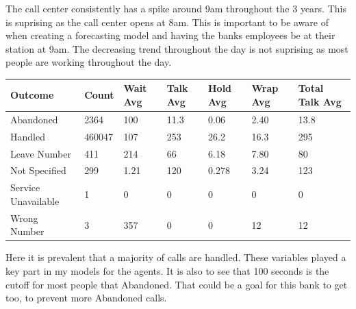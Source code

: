 \documentclass[12pt]{article}
\begin{document}
The call center consistently has a spike around 9am throughout the 3 years. This is suprising as the call center opens at 8am. This is important to be aware of when
creating a forecasting model and having the banks employees be at their station at 9am. The decreasing trend throughout the day is not suprising
as most people are working throughout the day.
\begin{table}[H]
  \resizebox{\textwidth}{!} {
  \begin{tabular}{ l | l | l | l | l | l | l}
    {\bf Outcome} & {\bf Count} & {\bf Wait Avg} & {\bf Talk Avg} & {\bf Hold Avg} & {\bf Wrap Avg} & {\bf Total Talk Avg} \\
  \hline
  Abandoned & 2364 & 100 & 11.3 & 0.06 & 2.40 & 13.8 \\
  \hline
  Handled & 460047 & 107 & 253 & 26.2 & 16.3 & 295\\
  \hline
  Leave Number & 411 & 214 & 66 & 6.18 & 7.80 & 80\\
  \hline
  Not Specified & 299 & 1.21 & 120 & 0.278 & 3.24 & 123\\
  \hline
  Service Unavailable & 1 & 0 & 0 & 0 & 0 & 0\\
  \hline
  Wrong Number & 3 & 357 & 0 & 0 & 12 & 12\\
  \end{tabular}
  }
  \end{table}
Here it is prevalent that a majority of calls are handled. These variables played a key part in my models for the agents. It is also to see that 
100 seconds is the cutoff for most people that Abandoned. That could be a goal for this bank to get too, to prevent more Abandoned calls. 
\end{document}
